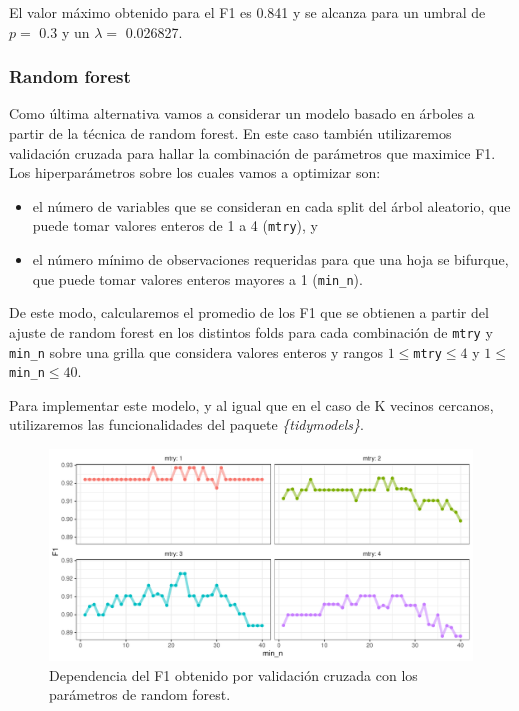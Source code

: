 \documentclass[
]{article}
\providecommand{\tightlist}{%
  \setlength{\itemsep}{0pt}\setlength{\parskip}{0pt}}
\begin{document}
El valor máximo obtenido para el F1 es 0.841 y se alcanza para un umbral
de \(p=\) 0.3 y un \(\lambda=\) 0.026827.

\hypertarget{random-forest}{%
\subsubsection{Random forest}\label{random-forest}}

Como última alternativa vamos a considerar un modelo basado en árboles a
partir de la técnica de random forest. En este caso también utilizaremos
validación cruzada para hallar la combinación de parámetros que maximice
F1. Los hiperparámetros sobre los cuales vamos a optimizar son:

\begin{itemize}
\tightlist
\item
  el número de variables que se consideran en cada split del árbol
  aleatorio, que puede tomar valores enteros de 1 a 4 (\texttt{mtry}), y
\item
  el número mínimo de observaciones requeridas para que una hoja se
  bifurque, que puede tomar valores enteros mayores a 1
  (\texttt{min\_n}).
\end{itemize}

De este modo, calcularemos el promedio de los F1 que se obtienen a
partir del ajuste de random forest en los distintos folds para cada
combinación de \texttt{mtry} y \texttt{min\_n} sobre una grilla que
considera valores enteros y rangos \(1 \leq\)\texttt{mtry}\(\leq 4\) y
\(1 \leq\)\texttt{min\_n}\(\leq 40\).

Para implementar este modelo, y al igual que en el caso de K vecinos
cercanos, utilizaremos las funcionalidades del paquete
\emph{\{tidymodels\}}.

\begin{figure}[H]

{\centering \includegraphics{Charaf-Spiousas_Clasificacion0_files/figure-latex/unnamed-chunk-9-1} 

}

\caption{\label{fig:random}Dependencia del F1 obtenido por validación cruzada con los parámetros de random forest.}\label{fig:unnamed-chunk-9}
\end{figure}
\end{document}
